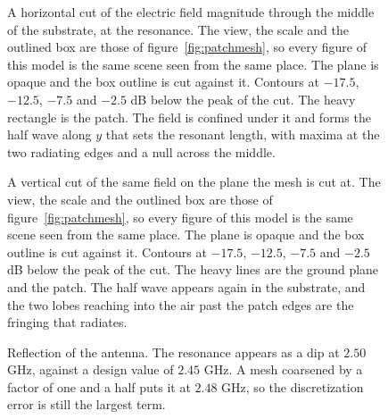 \documentclass[11pt]{article}
\begin{document}
\begin{figure}[H]
\centering
\begin{tikzpicture}

\end{tikzpicture}
\caption{A horizontal cut of the electric field magnitude through the middle of the substrate, at the resonance. The view, the scale and the outlined box are those of figure~\ref{fig:patchmesh}, so every figure of this model is the same scene seen from the same place. The plane is opaque and the box outline is cut against it. Contours at \(-17.5\), \(-12.5\), \(-7.5\) and \(-2.5\) dB below the peak of the cut. The heavy rectangle is the patch. The field is confined under it and forms the half wave along \(y\) that sets the resonant length, with maxima at the two radiating edges and a null across the middle.}
\label{fig:patchh}
\end{figure}

\begin{figure}[H]
\centering
\begin{tikzpicture}

\end{tikzpicture}
\caption{A vertical cut of the same field on the plane the mesh is cut at. The view, the scale and the outlined box are those of figure~\ref{fig:patchmesh}, so every figure of this model is the same scene seen from the same place. The plane is opaque and the box outline is cut against it. Contours at \(-17.5\), \(-12.5\), \(-7.5\) and \(-2.5\) dB below the peak of the cut. The heavy lines are the ground plane and the patch. The half wave appears again in the substrate, and the two lobes reaching into the air past the patch edges are the fringing that radiates.}
\label{fig:patchv}
\end{figure}

\begin{figure}[H]
\centering
{}
\caption{Reflection of the antenna. The resonance appears as a dip at
\(2.50\) GHz, against a design value of \(2.45\) GHz. A mesh coarsened by
a factor of one and a half puts it at \(2.48\) GHz, so the discretization
error is still the largest term.}
\label{fig:patchs}
\end{figure}
\end{document}
